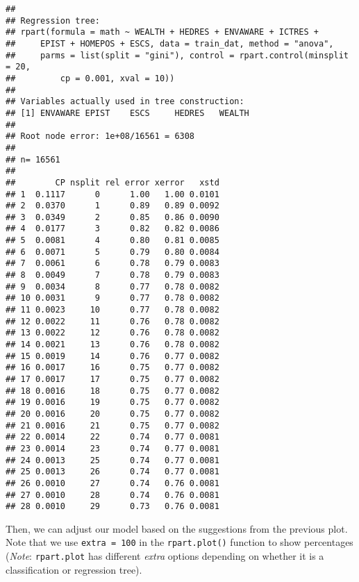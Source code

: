 \documentclass[
]{book}
\begin{document}
\begin{verbatim}
## 
## Regression tree:
## rpart(formula = math ~ WEALTH + HEDRES + ENVAWARE + ICTRES + 
##     EPIST + HOMEPOS + ESCS, data = train_dat, method = "anova", 
##     parms = list(split = "gini"), control = rpart.control(minsplit = 20, 
##         cp = 0.001, xval = 10))
## 
## Variables actually used in tree construction:
## [1] ENVAWARE EPIST    ESCS     HEDRES   WEALTH  
## 
## Root node error: 1e+08/16561 = 6308
## 
## n= 16561 
## 
##        CP nsplit rel error xerror   xstd
## 1  0.1117      0      1.00   1.00 0.0101
## 2  0.0370      1      0.89   0.89 0.0092
## 3  0.0349      2      0.85   0.86 0.0090
## 4  0.0177      3      0.82   0.82 0.0086
## 5  0.0081      4      0.80   0.81 0.0085
## 6  0.0071      5      0.79   0.80 0.0084
## 7  0.0061      6      0.78   0.79 0.0083
## 8  0.0049      7      0.78   0.79 0.0083
## 9  0.0034      8      0.77   0.78 0.0082
## 10 0.0031      9      0.77   0.78 0.0082
## 11 0.0023     10      0.77   0.78 0.0082
## 12 0.0022     11      0.76   0.78 0.0082
## 13 0.0022     12      0.76   0.78 0.0082
## 14 0.0021     13      0.76   0.78 0.0082
## 15 0.0019     14      0.76   0.77 0.0082
## 16 0.0017     16      0.75   0.77 0.0082
## 17 0.0017     17      0.75   0.77 0.0082
## 18 0.0016     18      0.75   0.77 0.0082
## 19 0.0016     19      0.75   0.77 0.0082
## 20 0.0016     20      0.75   0.77 0.0082
## 21 0.0016     21      0.75   0.77 0.0082
## 22 0.0014     22      0.74   0.77 0.0081
## 23 0.0014     23      0.74   0.77 0.0081
## 24 0.0013     25      0.74   0.77 0.0081
## 25 0.0013     26      0.74   0.77 0.0081
## 26 0.0010     27      0.74   0.76 0.0081
## 27 0.0010     28      0.74   0.76 0.0081
## 28 0.0010     29      0.73   0.76 0.0081
\end{verbatim}

Then, we can adjust our model based on the suggestions from the previous plot. Note that we use \texttt{extra\ =\ 100} in the \texttt{rpart.plot()} function to show percentages (\emph{Note}: \texttt{rpart.plot} has different \emph{extra} options depending on whether it is a classification or regression tree).
\end{document}
